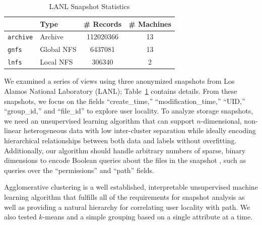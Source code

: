 \begin{table}%
\centering
\small
\caption{LANL Snapshot Statistics}
\begin{tabular}{llcc}
\toprule
&Type&\# Records&\# Machines\\
\midrule
\texttt{archive}&Archive&112020366&13\\ 
\texttt{gnfs}&Global NFS&6437081&13\\
\texttt{lnfs}&Local NFS&306340&2\\
\bottomrule
\end{tabular}
\label{tab:datasets}
\end{table}
\normalsize

We examined a series of views using three anonymized snapshots from Los Alamos
National Laboratory (LANL); Table~\ref{tab:datasets} contains details.    
From these snapshots, we focus on the fields ``create\_time,'' ``modification\_time,''
``UID,'' ``group\_id,'' and ``file\_id'' to explore user locality.
To analyze storage snapshots, we need an unsupervised learning algorithm that can support $n$-dimensional, non-linear heterogeneous data with low inter-cluster separation while ideally encoding hierarchical relationships between both data and labels without overfitting.
Additionally, our algorithm should handle arbitrary numbers of sparse, binary
dimensions to encode Boolean queries about the files in the snapshot
, such as queries over the ``permissions'' and ``path'' fields.  


Agglomerative clustering is a well established, interpretable unsupervised
machine learning algorithm that fulfills all of the requirements for snapshot
analysis as well as providing a natural hierarchy for correlating user locality with path.  We also tested $k$-means and a simple grouping based on a single attribute at a time. 

